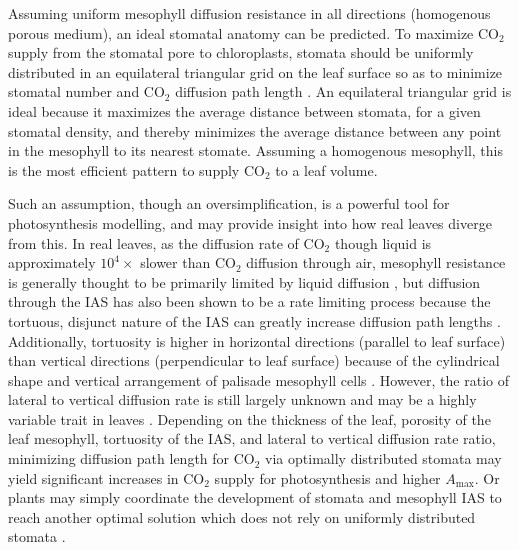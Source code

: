 \documentclass[webpdf,large,modern,unnumsec,namedate]{oup-authoring-template}
\begin{document}
Assuming uniform mesophyll diffusion resistance in all directions
(homogenous porous medium), an ideal stomatal anatomy can be predicted.
To maximize CO\(_2\) supply from the stomatal pore to chloroplasts,
stomata should be uniformly distributed in an equilateral triangular
grid on the leaf surface so as to minimize stomatal number and CO\(_2\)
diffusion path length \citep{parkhurst_diffusion_1994}. An equilateral
triangular grid is ideal because it maximizes the average distance
between stomata, for a given stomatal density, and thereby minimizes the
average distance between any point in the mesophyll to its nearest
stomate. Assuming a homogenous mesophyll, this is the most efficient
pattern to supply CO\(_2\) to a leaf volume.

Such an assumption, though an oversimplification, is a powerful tool for
photosynthesis modelling, and may provide insight into how real leaves
diverge from this. In real leaves, as the diffusion rate of CO\(_2\)
though liquid is approximately \(10^4\times\) slower than CO\(_2\)
diffusion through air, mesophyll resistance is generally thought to be
primarily limited by liquid diffusion
\citep{aalto_three-dimensional_2002, evans_resistances_2009}, but
diffusion through the IAS has also been shown to be a rate limiting
process because the tortuous, disjunct nature of the IAS can greatly
increase diffusion path lengths \citep{harwood_understanding_2021}.
Additionally, tortuosity is higher in horizontal directions (parallel to
leaf surface) than vertical directions (perpendicular to leaf surface)
because of the cylindrical shape and vertical arrangement of palisade
mesophyll cells \citep{earles_beyond_2018, harwood_understanding_2021}.
However, the ratio of lateral to vertical diffusion rate is still
largely unknown and may be a highly variable trait in leaves
\citep{morison_lateral_2005, pieruschka_lateral_2005, pieruschka_lateral_2006, morison_does_2007}.
Depending on the thickness of the leaf, porosity of the leaf mesophyll,
tortuosity of the IAS, and lateral to vertical diffusion rate ratio,
minimizing diffusion path length for CO\(_2\) via optimally distributed
stomata may yield significant increases in CO\(_2\) supply for
photosynthesis and higher \(A_\text{max}\). Or plants may simply
coordinate the development of stomata and mesophyll IAS to reach another
optimal solution which does not rely on uniformly distributed stomata
\citep{baillie_developmental_2020}.
\end{document}
